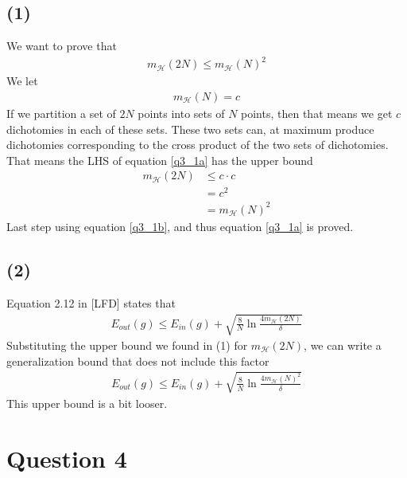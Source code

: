 \documentclass[a4paper]{article}
\begin{document}
\subsection*{(1)}
We want to prove that
\begin{align}
m_{\mathcal{H}}(2N)\leq m_{\mathcal{H}}(N)^2
\label{q3_1a}
\end{align}
We let
\begin{align}\label{q3_1b}
m_{\mathcal{H}}(N)= c
\end{align}
If we partition a set of $2N$ points into sets of $N$ points, then that means we get $c$ dichotomies in each of these sets. These two sets can, at maximum produce dichotomies corresponding to the cross product of the two sets of dichotomies. That means the LHS of equation \ref{q3_1a} has the upper bound
\begin{align*}
m_{\mathcal{H}}(2N)&\leq c\cdot c \\
&=c^2 \\
&=m_{\mathcal{H}}(N)^2
\end{align*}
Last step using equation \ref{q3_1b}, and thus equation \ref{q3_1a} is proved.

\subsection*{(2)}
Equation 2.12 in [LFD] states that
\begin{align*}
E_{out}(g)\leq E_{in}(g)+\sqrt{\frac{8}{N}\ln \frac{4m_{\mathcal{H}}(2N)}{\delta}}
\end{align*}
Substituting the upper bound we found in (1) for $m_\mathcal{H}(2N)$, we can write a generalization bound that does not include this factor
\begin{align*}
E_{out}(g)\leq E_{in}(g)+\sqrt{\frac{8}{N}\ln \frac{4m_{\mathcal{H}}(N)^2}{\delta}}
\end{align*}
This upper bound is a bit looser.

\newpage
\section*{Question 4}
\end{document}
